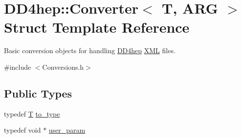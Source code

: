 \hypertarget{struct_d_d4hep_1_1_converter}{
\section{DD4hep::Converter$<$ T, ARG $>$ Struct Template Reference}
\label{struct_d_d4hep_1_1_converter}
}


Basic conversion objects for handling \hyperlink{namespace_d_d4hep}{DD4hep} \hyperlink{namespace_d_d4hep_1_1_x_m_l}{XML} files.  


{\ttfamily \#include $<$Conversions.h$>$}\subsection*{Public Types}
\begin{DoxyCompactItemize}
\item 
typedef \hyperlink{class_t}{T} \hyperlink{struct_d_d4hep_1_1_converter_ab6977053b60eb411fc88ac61e7a47832}{to\_\-type}
\item 
typedef void $\ast$ \hyperlink{struct_d_d4hep_1_1_converter_a13a876ea9cfcadf85a3dadd32e97a834}{user\_\-param}
\end{DoxyCompactItemize}

